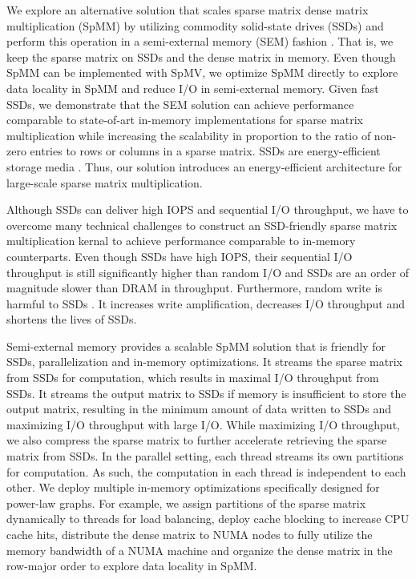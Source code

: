 We explore an alternative solution that scales sparse matrix dense matrix
multiplication (SpMM) by utilizing commodity solid-state drives (SSDs) and
perform this operation in a semi-external memory (SEM) fashion
\cite{flashgraph, Abello98}. That is, we keep the sparse matrix on SSDs and
the dense matrix in memory. Even though SpMM can be implemented with SpMV,
we optimize SpMM directly to explore data locality in SpMM and reduce I/O
in semi-external memory. Given fast SSDs, we demonstrate that the SEM solution
can achieve performance comparable to state-of-art in-memory implementations
for sparse matrix multiplication while increasing the scalability in proportion
to the ratio of non-zero entries to rows or columns in a sparse matrix.
SSDs are energy-efficient storage media \cite{}. Thus, our solution introduces
an energy-efficient architecture for large-scale sparse matrix multiplication.


Although SSDs can deliver high IOPS and sequential I/O throughput, we have
to overcome many technical challenges to construct an SSD-friendly sparse matrix
multiplication kernal to achieve performance comparable to in-memory
counterparts. Even though SSDs have high IOPS, their sequential I/O throughput
is still significantly higher than random I/O and SSDs are an order of
magnitude slower than DRAM in throughput. Furthermore, random write is harmful
to SSDs \cite{sfs}. It increases write amplification, decreases I/O throughput
and shortens the lives of SSDs.

Semi-external memory provides a scalable SpMM
solution that is friendly for SSDs, parallelization and in-memory optimizations.
It streams the sparse matrix from SSDs for computation, which results in maximal
I/O throughput from SSDs. It streams the output matrix to SSDs if
memory is insufficient to store the output matrix, resulting in
the minimum amount of data written to SSDs and maximizing I/O throughput with
large I/O. While maximizing I/O throughput, we also compress
the sparse matrix to further accelerate retrieving the sparse matrix from SSDs.
In the parallel setting, each thread streams its own partitions for computation.
As such, the computation in each thread is independent to each other.
We deploy multiple in-memory optimizations specifically designed for power-law
graphs. For example, we assign partitions of the sparse matrix dynamically to
threads for load balancing, deploy cache blocking to increase CPU cache hits,
distribute the dense matrix to NUMA nodes to fully utilize the memory
bandwidth of a NUMA machine and organize the dense matrix in the row-major order
to explore data locality in SpMM.

